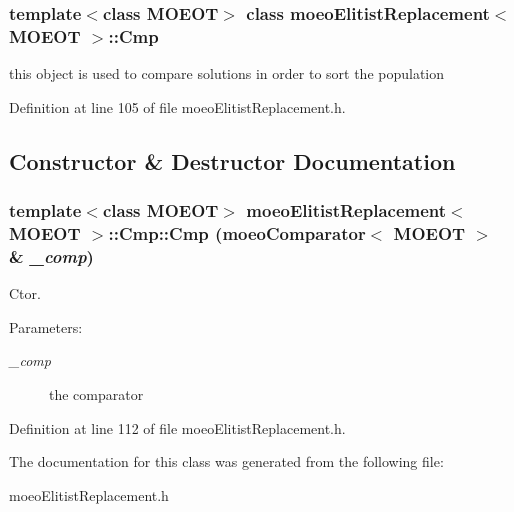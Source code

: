 \subsubsection*{template$<$class MOEOT$>$ class moeo\-Elitist\-Replacement$<$ MOEOT $>$::Cmp}

this object is used to compare solutions in order to sort the population 



Definition at line 105 of file moeo\-Elitist\-Replacement.h.

\subsection{Constructor \& Destructor Documentation}
\subsubsection{\setlength{\rightskip}{0pt plus 5cm}template$<$class MOEOT$>$ \bf{moeo\-Elitist\-Replacement}$<$ MOEOT $>$::Cmp::Cmp (\bf{moeo\-Comparator}$<$ MOEOT $>$ \& {\em \_\-comp})\hspace{0.3cm}{\tt  [inline]}}\label{classmoeoElitistReplacement_1_1Cmp_c9f21fe0df172dc601a13d6531c5ffd9}


Ctor. 

\begin{Desc}
\item[Parameters:]
\begin{description}
\item[{\em \_\-comp}]the comparator \end{description}
\end{Desc}


Definition at line 112 of file moeo\-Elitist\-Replacement.h.

The documentation for this class was generated from the following file:\begin{CompactItemize}
\item 
moeo\-Elitist\-Replacement.h\end{CompactItemize}

